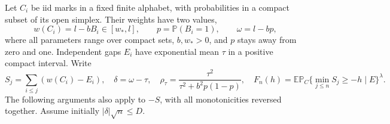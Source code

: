 Let $C_i$ be iid marks in a fixed finite alphabet, with probabilities in
a compact subset of its open simplex. Their weights have two values,
\[
 w(C_i)=l-bB_i\in[w_*,l],\qquad
 p=\mathbb P(B_i=1),\qquad \omega=l-bp,
\]
where all parameters range over compact sets, $b,w_*>0$, and $p$ stays
away from zero and one. Independent gaps $E_i$ have exponential mean
$\tau$ in a positive compact interval. Write
\begin{equation}
 S_j=\sum_{i\le j}(w(C_i)-E_i),\quad
 \delta=\omega-\tau,\quad
 \rho_\tau=\frac{\tau^2}{\tau^2+b^2p(1-p)},\quad
 F_n(h)=\mathbb E\mathbb P_C\{\min_{j\le n}S_j\ge-h\mid E\}^{\lambda}.
 \label{pr:walk}
\end{equation}
The following arguments also apply to $-S$, with all monotonicities
reversed together. Assume initially $|\delta|\sqrt n\le D$.

